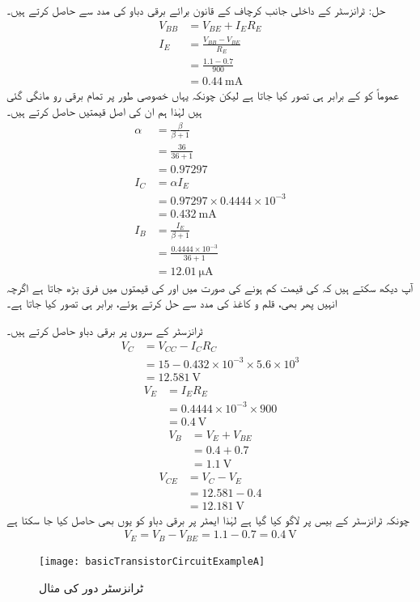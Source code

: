 حل:
ٹرانزسٹر کے داخلی جانب کرچاف کے قانون برائے برقی دباو کی مدد سے  حاصل کرتے ہیں۔
\begin{align*}
V_{BB} &=V_{BE}+I_{E}R_{E}\\
I_E&=\frac{V_{BB}-V_{BE}}{R_E}\\
&=\frac{1.1-0.7}{900}\\
&=\SI{0.44}{\milli \ampere}
\end{align*}
عموماً  کو  کے برابر ہی تصور کیا جاتا ہے لیکن چونکہ یہاں خصوصی طور پر تمام برقی رو مانگی گئی ہیں لہٰذا ہم ان کی اصل قیمتیں حاصل کرتے ہیں۔
\begin{align*}
\alpha&=\frac{\beta}{\beta+1}\\
&=\frac{36}{36+1}\\
&=\num{0.97297}
\\
I_C&=\alpha I_E\\
&=0.97297 \times  0.4444  \times 10^{-3}\\
&=\SI{0.432}{\milli \ampere}\\
I_B&=\frac{I_E}{\beta+1}\\
&=\frac{0.4444 \times 10^{-3}}{36+1}\\
&=\SI{12.01}{\micro \ampere}
\end{align*}
آپ دیکھ سکتے ہیں کہ  کی قیمت کم ہونے کی صورت میں  اور  کی قیمتوں میں فرق بڑھ جاتا ہے اگرچہ انہیں پھر بھی، قلم و کاغذ کی مدد سے حل کرتے ہوئے، برابر ہی تصور کیا جاتا ہے۔

ٹرانزسٹر کے سروں پر برقی دباو حاصل کرتے ہیں۔
\begin{align*}
V_C&=V_{CC}-I_{C}R_{C}\\
&=15-0.432 \times 10^{-3} \times 5.6 \times 10^{3}\\
&=\SI{12.581}{\volt}
\end{align*}
%
\begin{align*}
V_E&=I_{E}R_{E}\\
&=0.4444 \times 10^{-3} \times 900\\
&=\SI{0.4}{\volt} 
\end{align*}
%
\begin{align*}
V_B&=V_E+V_{BE}\\
&=0.4+0.7\\
&=\SI{1.1}{\volt}
\end{align*}
%
\begin{align*}
V_{CE}&=V_C-V_E\\
&=12.581-0.4\\
&=\SI{12.181}{\volt}
\end{align*}
چونکہ ٹرانزسٹر کے بیس پر  لاگو کیا گیا ہے لہٰذا ایمٹر پر برقی دباو کو یوں بھی حاصل کیا جا سکتا ہے
\begin{align*}
V_E=V_B-V_{BE}=1.1-0.7=\SI{0.4}{\volt}
\end{align*}
%
\begin{figure}
\centering
\texttt{[image: basicTransistorCircuitExampleA]}
\caption{ ٹرانزسٹر دور کی مثال}
\label{شکل_ٹرانزسٹر_دور_کی_مثال}
\end{figure}

